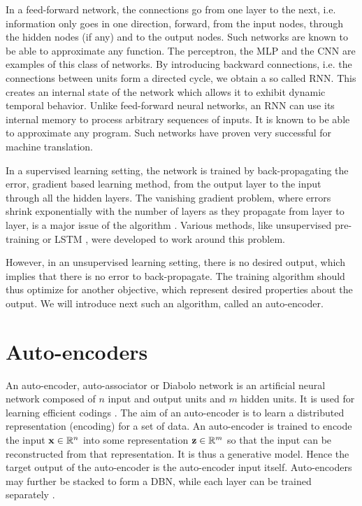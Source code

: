
In a feed-forward network, the connections go from one layer to the next, i.e. information only goes in one direction, forward, from the input nodes, through the hidden nodes (if any) and to the output nodes. Such networks are known to be able to approximate any function. The perceptron, the \gls{MLP} and the \gls{CNN} are examples of this class of networks.
By introducing backward connections, i.e. the connections between units form a directed cycle, we obtain a so called \gls{RNN}. This creates an internal state of the network which allows it to exhibit dynamic temporal behavior. Unlike feed-forward neural networks, an \gls{RNN} can use its internal memory to process arbitrary sequences of inputs. It is known to be able to approximate any program. Such networks have proven very successful for machine translation.

In a supervised learning setting, the network is trained by back-propagating the error, gradient based learning method, from the output layer to the input through all the hidden layers.
The vanishing gradient problem, where errors shrink exponentially with the number of layers as they propagate from layer to layer, is a major issue of the algorithm \cite{hochreiter2001vanishingGradient}. Various methods, like unsupervised pre-training or \gls{LSTM} \cite{hochreiter1997LSTM}, were developed to work around this problem.

However, in an unsupervised learning setting, there is no desired output, which implies that there is no error to back-propagate. The training algorithm should thus optimize for another objective, which represent desired properties about the output. We will introduce next such an algorithm, called an auto-encoder.

\section{Auto-encoders} \label{sec:auto_encoders}

An auto-encoder, auto-associator or Diabolo network is an artificial neural network composed of $n$ input and output units and $m$ hidden units. It is used for learning efficient codings \cite{bourlard1988autoencoder, hinton1994autoencoder}. The aim of an auto-encoder is to learn a distributed representation (encoding) for a set of data. An auto-encoder is trained to encode the input $\mathbf{x} \in \mathbb{R}^n$ into some representation $\mathbf{z} \in \mathbb{R}^m$ so that the input can be reconstructed from that representation. It is thus a generative model. Hence the target output of the auto-encoder is the auto-encoder input itself. Auto-encoders may further be stacked to form a \gls{DBN}, while each layer can be trained separately \cite{bengio2007DBN, ranzato2007stackedSparseAutoencoders}.

